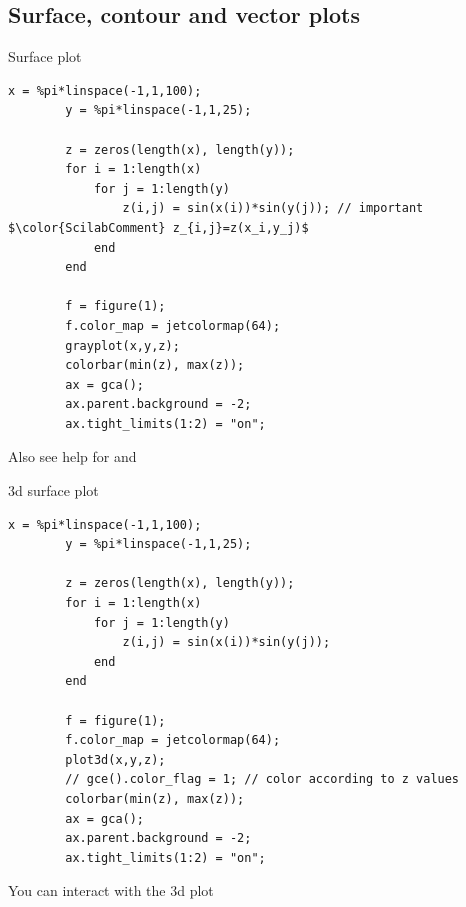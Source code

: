 \subsection{Surface, contour and vector plots}
\begin{frame}[fragile]{Surface plot}
    \begin{lstlisting}[basicstyle=\small\ttfamily\linespread{1}, mathescape]
        x = %pi*linspace(-1,1,100);
        y = %pi*linspace(-1,1,25);
        
        z = zeros(length(x), length(y));
        for i = 1:length(x)
            for j = 1:length(y)
                z(i,j) = sin(x(i))*sin(y(j)); // important $\color{ScilabComment} z_{i,j}=z(x_i,y_j)$
            end
        end
        
        f = figure(1);
        f.color_map = jetcolormap(64);
        grayplot(x,y,z);
        colorbar(min(z), max(z));
        ax = gca();
        ax.parent.background = -2;
        ax.tight_limits(1:2) = "on";
    \end{lstlisting}
    Also see help for  and 
\end{frame}

\begin{frame}[fragile]{3d surface plot}
    \vspace{-0.5em}
    \begin{lstlisting}[basicstyle=\small\ttfamily\linespread{1}]
        x = %pi*linspace(-1,1,100);
        y = %pi*linspace(-1,1,25);
        
        z = zeros(length(x), length(y));
        for i = 1:length(x)
            for j = 1:length(y)
                z(i,j) = sin(x(i))*sin(y(j));
            end
        end
        
        f = figure(1);
        f.color_map = jetcolormap(64);
        plot3d(x,y,z);
        // gce().color_flag = 1; // color according to z values
        colorbar(min(z), max(z));
        ax = gca();
        ax.parent.background = -2;
        ax.tight_limits(1:2) = "on";
    \end{lstlisting}
    You can interact with the 3d plot
\end{frame}

